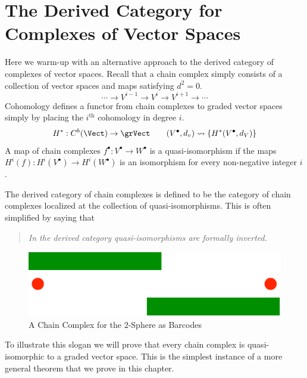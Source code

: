 \section{The Derived Category for Complexes of Vector Spaces}
\label{subsec:derived_vect}

Here we warm-up with an alternative approach to the derived category of complexes of vector spaces. Recall that a chain complex simply consists of a collection of vector spaces and maps satisfying $d^2=0$.
\[
\cdots \to V^{i-1} \to V^i \to V^{i+1} \to \cdots 
\]
Cohomology defines a functor from chain complexes to graded vector spaces simply by placing the $i^{\mathrm{th}}$ cohomology in degree $i$.
\[
H^*:C^b(\Vect)\to \grVect \qquad (V^{\bullet},d_v) \rightsquigarrow \{H^*(V^{\bullet},d_V)\}
\]
A map of chain complexes $f^{\bullet}:V^{\bullet}\to W^{\bullet}$ is a quasi-isomorphism if the maps $H^i(f):H^i(V^{\bullet})\to H^i(W^{\bullet})$ is an isomorphism for every non-negative integer $i$.

The derived category of chain complexes is defined to be the category of chain complexes localized at the collection of quasi-isomorphisms. This is often simplified by saying that
\begin{quote}
\centering
{\em In the derived category quasi-isomorphisms are formally inverted.}
\end{quote}

\begin{figure}
\centering
\includegraphics[width=.4\textwidth]{bar_chain.pdf}
\caption{A Chain Complex for the 2-Sphere as Barcodes}
\label{fig:bar_chain}
\end{figure}

To illustrate this slogan we will prove that every chain complex is quasi-isomorphic to a graded vector space. This is the simplest instance of a more general theorem that we prove in this chapter.

